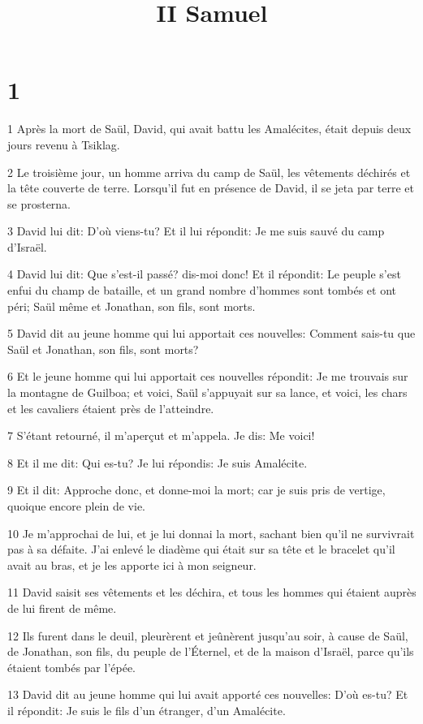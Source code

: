

\title{II Samuel}


\chapter{1}

\par 1 Après la mort de Saül, David, qui avait battu les Amalécites, était depuis deux jours revenu à Tsiklag.
\par 2 Le troisième jour, un homme arriva du camp de Saül, les vêtements déchirés et la tête couverte de terre. Lorsqu'il fut en présence de David, il se jeta par terre et se prosterna.
\par 3 David lui dit: D'où viens-tu? Et il lui répondit: Je me suis sauvé du camp d'Israël.
\par 4 David lui dit: Que s'est-il passé? dis-moi donc! Et il répondit: Le peuple s'est enfui du champ de bataille, et un grand nombre d'hommes sont tombés et ont péri; Saül même et Jonathan, son fils, sont morts.
\par 5 David dit au jeune homme qui lui apportait ces nouvelles: Comment sais-tu que Saül et Jonathan, son fils, sont morts?
\par 6 Et le jeune homme qui lui apportait ces nouvelles répondit: Je me trouvais sur la montagne de Guilboa; et voici, Saül s'appuyait sur sa lance, et voici, les chars et les cavaliers étaient près de l'atteindre.
\par 7 S'étant retourné, il m'aperçut et m'appela. Je dis: Me voici!
\par 8 Et il me dit: Qui es-tu? Je lui répondis: Je suis Amalécite.
\par 9 Et il dit: Approche donc, et donne-moi la mort; car je suis pris de vertige, quoique encore plein de vie.
\par 10 Je m'approchai de lui, et je lui donnai la mort, sachant bien qu'il ne survivrait pas à sa défaite. J'ai enlevé le diadème qui était sur sa tête et le bracelet qu'il avait au bras, et je les apporte ici à mon seigneur.
\par 11 David saisit ses vêtements et les déchira, et tous les hommes qui étaient auprès de lui firent de même.
\par 12 Ils furent dans le deuil, pleurèrent et jeûnèrent jusqu'au soir, à cause de Saül, de Jonathan, son fils, du peuple de l'Éternel, et de la maison d'Israël, parce qu'ils étaient tombés par l'épée.
\par 13 David dit au jeune homme qui lui avait apporté ces nouvelles: D'où es-tu? Et il répondit: Je suis le fils d'un étranger, d'un Amalécite.
